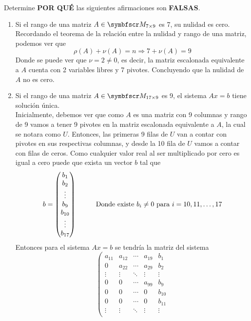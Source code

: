 \item Determine \textbf{POR QUÉ} las siguientes afirmaciones son \textbf{FALSAS}.
    \begin{enumerate}[label=\listAlph]
        \item Si el rango de una matriz \(A \in \fm_{7 \times 9}\) es 7, su nulidad es cero. \\
            Recordando el teorema de la relación entre la nulidad y rango de una matriz, podemos ver que 
            \[
                \rho(A) + \nu(A) = n \Rightarrow 7 + \nu(A) = 9
            \]
            Donde se puede ver que \(\nu = 2 \neq 0\), es decir, la matriz escalonada equivalente a \(A\) cuenta con 2 variables libres y 7 pivotes.
            Concluyendo que la nulidad de \(A\) no es cero.
        \item Si el rango de una matriz \(A \in \fm_{17 \times 9}\) es 9, el sistema \(Ax = b\) tiene solución única. \\
            Inicialmente, debemos ver que como \(A\) es una matriz con 9 columnas y rango de 9 vamos a tener 9 pivotes en la matriz escalonada equivalente a \(A\), 
            la cual se notara como \(U\).
            Entonces, las primeras 9 filas de \(U\) van a contar con pivotes en sus respectivas columnas, 
            y desde la 10 fila de \(U\) vamos a contar con filas de ceros. Como cualquier valor real al ser multiplicado por cero es igual a cero puede 
            que exista un vector \(b\) tal que 
            \[
                b = \fvec{b_1, b_2, \vdots, b_9, b_{10}, \vdots, b_{17}}
                \hspace{1cm}
                \text{Donde existe } b_{i} \neq 0 \text{ para } i = 10, 11, \ldots, 17
            \]
            Entonces para el sistema \(Ax = b\) se tendría la matriz del sistema
            \[
                \left(
                \begin{array}{cccc|c}
                    a_{11} & a_{12} & \cdots & a_{19} & b_1 \\
                    0 & a_{22} & \cdots & a_{29} & b_2 \\
                    \vdots & \vdots & \ddots & \vdots & \vdots \\
                    0 & 0 & \cdots & a_{99} & b_9 \\
                    0 & 0 & \cdots & 0 & b_{10} \\
                    0 & 0 & \cdots & 0 & b_{11} \\
                    \vdots & \vdots & \ddots & \vdots & \vdots \\

\end{array}\]
\end{enumerate}
